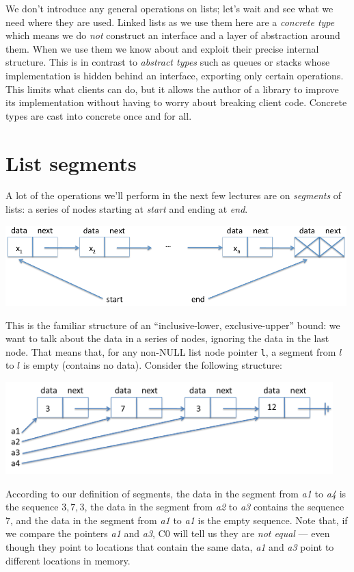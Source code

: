 We don't introduce any general operations on lists; let's wait and see what we
need where they are used.  Linked lists as we use them here are a
\emph{concrete type} which means we do \emph{not} construct an interface and a
layer of abstraction around them.  When we use them we know about and exploit
their precise internal structure.  This is in contrast to \emph{abstract types}
such as queues or stacks whose implementation is hidden behind an interface,
exporting only certain operations.  This limits what clients can do, but it
allows the author of a library to improve its implementation without having to
worry about breaking client code.  Concrete types are cast into concrete once
and for all.


\section{List segments}
\label{sec:linkedlist:segments}

A lot of the operations we'll perform in the next few lectures are on
\emph{segments} of lists: a series of nodes starting at \emph{start}
and ending at \emph{end}.

\begin{center}
\includegraphics[width=0.99\textwidth]{img/linkedlist.png}
\end{center}
This is the familiar structure of an ``inclusive-lower,
exclusive-upper'' bound: we want to talk about the data in a series of
nodes, ignoring the data in the last node. That means that, for any
non-NULL list node pointer \lstinline'l', a segment from $l$ to $l$ is
empty (contains no data). Consider the following structure:
\begin{center}
\includegraphics[width=0.95\textwidth]{img/linkedlist2.png}
\end{center}
According to our definition of segments, the data in the segment from
\emph{a1} to \emph{a4} is the sequence $3,7,3$, the data in the
segment from \emph{a2} to \emph{a3} contains the sequence $7$, and the
data in the segment from \emph{a1} to \emph{a1} is the empty
sequence. Note that, if we compare the pointers \emph{a1} and \emph{a3},
C0 will tell us they are \emph{not equal} --- even though they point to
locations that contain
the same data, \emph{a1} and \emph{a3} point to different locations in memory.


